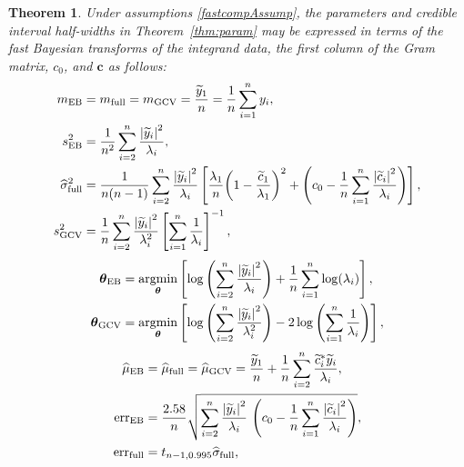 \documentclass{iitthesis}          %
\newcommand{\bm}[1]{\boldsymbol{#1}}
\newcommand{\vtheta}{{\bm{\theta}}}
\newcommand{\vc}{\bm{c}}
\newcommand{\hmu}{\widehat{\mu}}
\newcommand{\hsigma}{\widehat{\sigma}}
\newcommand{\MLE}{\textup{EB}}
\newcommand{\full}{\textup{full}}
\newcommand{\GCV}{\textup{GCV}}
\newcommand{\err}{\textup{err}}
\def\abs#1{\ensuremath{\left \lvert #1 \right \rvert}}
\providecommand{\argmin}{\operatorname*{argmin}}
\newtheorem{theorem}{Theorem}[section]
\begin{document}
\begin{theorem} \label{thm:fastparam}
	Under assumptions \eqref{fastcompAssump}, the parameters and credible interval half-widths in Theorem~\ref{thm:param} may be expressed in terms of the fast Bayesian transforms of the integrand data, the first column of the Gram matrix, $c_0$, and $\vc$ as follows:
	\begin{align}
	\nonumber
	m_\MLE &=  m_{\full} = m_{\GCV} =  \frac{\widetilde{y}_1}{n} = \frac 1n \sum_{i=1}^n y_i,
	\\
	\nonumber
	s^2_\MLE 
	& =
	\frac{1}{n^2} 
	\sum_{i=2}^n \frac{\abs{\widetilde{y}_i}^2}{\lambda_i}, \\
	\nonumber
	\widehat{\sigma}^2_{\textup{full}}
	& =
	\frac{1}{n(n-1)} \sum_{i=2}^n \frac{\abs{\widetilde{y}_i}^2}{\lambda_i}
	\left[\frac{\lambda_1}{n}{\left(1 - \frac{\widetilde{c}_1}{\lambda_1}\right)^2} + \left(c_0  - \frac 1n \sum_{i=1}^n \frac{\abs{\widetilde{c}_i}^2}{\lambda_i}\right) \right], \\
	\nonumber 
	s^2_{\textup{GCV}} & =  \frac 1{n} \sum_{i=2}^n \frac{\abs{\widetilde{y}_i}^2}{\lambda_i^2}  \left [ \sum_{i=1}^n \frac{1}{\lambda_i} \right]^{-1},
	\end{align}
	\begin{subequations}
		\label{fastTheta}
		\begin{align}
		\label{eqn_MLE_loss_func_optimized_2}
		\vtheta_\MLE
		&= 
		\argmin_{\vtheta}
		\left[
		\log\left(
		\sum_{i=2}^n \frac{\abs{\widetilde{y}_i}^2}{\lambda_{i}}
		\right) 
		+ \frac{1}{n}\sum_{i=1}^n \log(\lambda_{i})
		\right],\\
		\label{thetaGCV} 
		\vtheta_{\GCV} 
		&= \argmin_\vtheta \left[ \log \left ( \sum_{i=2}^n \frac{\abs{\widetilde{y}_i}^2}{\lambda_{i}^2} 
		\right)  
		-2\log\left( \sum_{i=1}^n \frac{1}{\lambda_{i}} \right)
		\right], 
		\end{align}
	\end{subequations}
	\begin{align}
	\nonumber
	\hmu_\MLE  &= \hmu_{\full} = \hmu_{\GCV} =
	\frac{\widetilde{y}_1}{n} +
	\frac 1n \sum_{i=2}^n \frac{ \widetilde{c}_i^* \widetilde{y}_i}{\lambda_i}, \\
	\nonumber
	\err_\MLE  &
	=
	\frac{2.58}{n}\sqrt{
		\sum_{i=2}^{n} \frac{\abs{\widetilde{y}_i}^2}{\lambda_i}  
		\,
		\left( c_0 - \frac 1n \sum_{i=1}^n \frac{\abs{\widetilde{c}_i}^2}{\lambda_i} \right) 
	}, \\
	\nonumber
	\err_{\full} & = t_{n-1,0.995} \hsigma_{\textup{full}}, \\

\end{align}
\end{theorem}
\end{document}
